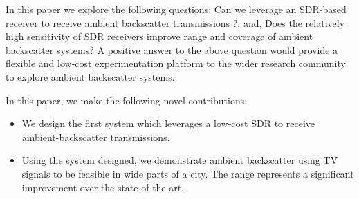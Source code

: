 In this paper we explore the following questions: Can we leverage an
SDR-based receiver to receive ambient backscatter transmissions ?, and, Does the  
relatively high sensitivity of SDR receivers improve
range and coverage of ambient backscatter systems? A positive answer to the above question would provide a
flexible and low-cost experimentation platform to the wider research community to explore ambient backscatter
systems.

  In this paper, we make the following novel contributions:

\begin{itemize}
		

				\item We design the first system which leverages a  low-cost 
					  SDR to receive ambient-backscatter transmissions. 
				\item  Using the system designed, we demonstrate ambient backscatter using TV signals
					   to be feasible in wide parts of a city. The range represents a significant improvement
					   over the state-of-the-art.
				
\end{itemize}

